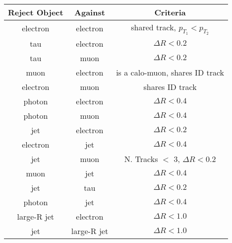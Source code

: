 %
\begin{tabular}{ccc}
\hline
\textbf{Reject Object} & \textbf{Against} & \textbf{Criteria} \\ \hline \hline
electron & electron & shared track, $p_{T_1}<p_{T_2}$ \\
tau & electron & $\Delta R<0.2$ \\
tau & muon & $\Delta R<0.2$ \\
muon & electron & is a calo-muon, shares ID track \\
electron & muon & shares ID track \\
photon & electron & $\Delta R<0.4$ \\
photon & muon & $\Delta R<0.4$ \\
jet & electron & $\Delta R<0.2$ \\
electron & jet & $\Delta R<0.4$ \\
jet & muon & N. Tracks $<$ 3, $\Delta R<0.2$ \\
muon & jet & $\Delta R<0.4$ \\
jet & tau & $\Delta R<0.2$ \\
photon & jet & $\Delta R<0.4$ \\
large-R jet & electron & $\Delta R<1.0$ \\
jet & large-R jet & $\Delta R<1.0$ \\ \hline
\end{tabular}
%
%